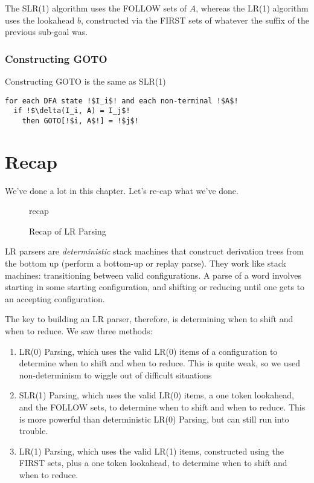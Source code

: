 The SLR(1) algorithm uses the FOLLOW sets of $A$, whereas the LR(1) algorithm uses the lookahead $b$, constructed via the FIRST sets of whatever the suffix of the previous sub-goal was.

\subsubsection{Constructing GOTO}
Constructing GOTO is the same as SLR(1)

\begin{code}
\begin{lstlisting}[style=pseudocode]
for each DFA state !$I_i$! and each non-terminal !$A$!
  if !$\delta(I_i, A) = I_j$! 
    then GOTO[!$i, A$!] = !$j$!
\end{lstlisting}
\vspace{1mm}
\end{code}

\section{Recap}
We've done a lot in this chapter. Let's re-cap what we've done. 

\begin{figure}[H]
    \centering
    {recap}
    \caption{Recap of LR Parsing}
    \label{fig:lr-parsing-recap}
\end{figure}

LR parsers are \textit{deterministic} stack machines that construct derivation trees from the bottom up (perform a bottom-up or replay parse). They work like stack machines: transitioning between valid configurations. A parse of a word involves starting in some starting configuration, and shifting or reducing until one gets to an accepting configuration. 

The key to building an LR parser, therefore, is determining when to shift and when to reduce. We saw three methods:

\begin{enumerate}
    \item LR(0) Parsing, which uses the valid LR(0) items of a configuration to determine when to shift and when to reduce. This is quite weak, so we used non-determinism to wiggle out of difficult situations
    \item SLR(1) Parsing, which uses the valid LR(0) items, a one token lookahead, and the FOLLOW sets, to determine when to shift and when to reduce. This is more powerful than deterministic LR(0) Parsing, but can still run into trouble. 
    \item LR(1) Parsing, which uses the valid LR(1) items, constructed using the FIRST sets, plus a one token lookahead, to determine when to shift and when to reduce.
\end{enumerate}

